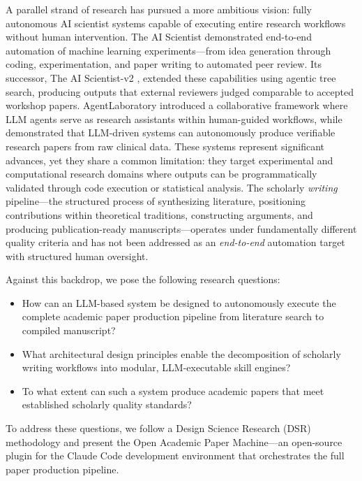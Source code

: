 \documentclass{article}
\begin{document}
A parallel strand of research has pursued a more ambitious vision: fully autonomous AI scientist systems capable of executing entire research workflows without human intervention. The AI Scientist \citep{lu2024ai_scientist} demonstrated end-to-end automation of machine learning experiments---from idea generation through coding, experimentation, and paper writing to automated peer review. Its successor, The AI Scientist-v2 \citep{yamada2025ai_scientist_v2}, extended these capabilities using agentic tree search, producing outputs that external reviewers judged comparable to accepted workshop papers. AgentLaboratory \citep{schmidgall2025agentlab} introduced a collaborative framework where LLM agents serve as research assistants within human-guided workflows, while \citet{ifargan2025autonomous} demonstrated that LLM-driven systems can autonomously produce verifiable research papers from raw clinical data. These systems represent significant advances, yet they share a common limitation: they target experimental and computational research domains where outputs can be programmatically validated through code execution or statistical analysis. The scholarly \emph{writing} pipeline---the structured process of synthesizing literature, positioning contributions within theoretical traditions, constructing arguments, and producing publication-ready manuscripts---operates under fundamentally different quality criteria and has not been addressed as an \emph{end-to-end} automation target with structured human oversight.

Against this backdrop, we pose the following research questions:
\begin{itemize}
    \item[\textbf{RQ1:}] How can an LLM-based system be designed to autonomously execute the complete academic paper production pipeline from literature search to compiled manuscript?
    \item[\textbf{RQ2:}] What architectural design principles enable the decomposition of scholarly writing workflows into modular, LLM-executable skill engines?
    \item[\textbf{RQ3:}] To what extent can such a system produce academic papers that meet established scholarly quality standards?
\end{itemize}

\noindent To address these questions, we follow a Design Science Research (DSR) methodology \citep{peffers2007dsrm} and present the Open Academic Paper Machine---an open-source plugin for the Claude Code development environment that orchestrates the full paper production pipeline.
\end{document}
